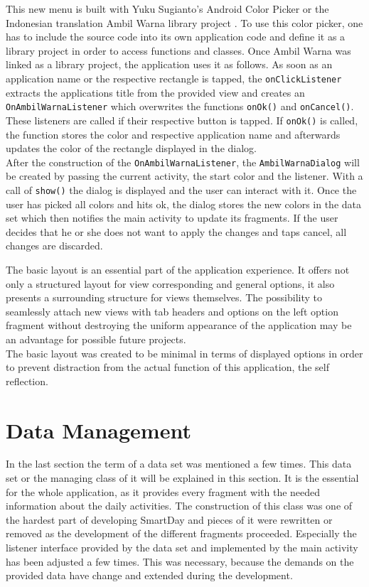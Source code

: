 This new menu is built with Yuku Sugianto's Android Color Picker or the Indonesian translation Ambil Warna library project \cite{colorpicker}. To use this color picker, one has to include the source code into its own application code and define it as a library project in order to access functions and classes. Once Ambil Warna was linked as a library project, the application uses it as follows. As soon as an application name or the respective rectangle is tapped, the \lstinline$onClickListener$ extracts the applications title from the provided view and creates an \lstinline$OnAmbilWarnaListener$ which overwrites the functions \lstinline$onOk()$ and \lstinline$onCancel()$. These listeners are called if their respective button is tapped. If \lstinline$onOk()$ is called, the function stores the color and respective application name and afterwards updates the color of the rectangle displayed in the dialog.\\
After  the construction of the \lstinline$OnAmbilWarnaListener$, the \lstinline$AmbilWarnaDialog$ will be created by passing the current activity, the start color and the listener. With a call of \lstinline$show()$ the dialog is displayed and the user can interact with it. Once the user has picked all colors and hits ok, the dialog stores the new colors in the data set which then notifies the main activity to update its fragments. If the user decides that he or she does not want to apply the changes and taps cancel, all changes are discarded.

The basic layout is an essential part of the application experience. It offers not only a structured layout for view corresponding and general options, it also presents a surrounding structure for views themselves. The possibility to seamlessly attach new views with tab headers and options on the left option fragment without destroying the uniform appearance of the application may be an advantage for possible future projects.\\
The basic layout was created to be minimal in terms of displayed options in order to prevent distraction from the actual function of this application, the self reflection.
\newpage
\section{Data Management}
\label{sec:datamanagement}
In the last section the term of a data set was mentioned a few times. This data set or the managing class of it will be explained in this section. It is the essential for the whole application, as it provides every fragment with the needed information about the daily activities. The construction of this class was one of the hardest part of developing SmartDay and pieces of it were rewritten or removed as the development of the different fragments proceeded. Especially the listener interface provided by the data set and implemented by the main activity has been adjusted a few times. This was necessary, because the demands on the provided data have change and extended during the development.

